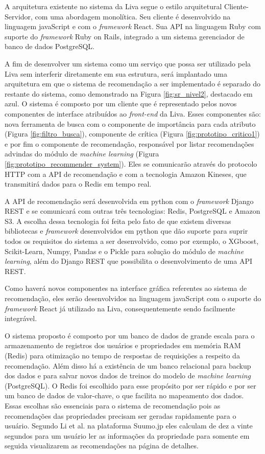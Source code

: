 A arquitetura existente no sistema da Liva segue o estilo arquitetural Cliente-Servidor, com uma abordagem monolítica. Seu cliente é desenvolvido na linguagem javaScript e com o \textit{framework} React. Sua API na linguagem Ruby com suporte do \textit{framework} Ruby on Rails, integrado a um sistema gerenciador de banco de dados PostgreSQL.

A fim de desenvolver um sistema como um serviço que possa ser utilizado pela Liva sem interferir diretamente em sua estrutura, será implantado uma arquitetura em que o sistema de recomendação a ser implementado é separado do restante do sistema, como demonstrado na Figura \ref{fig:sr_nivel2}, destacado em azul. O sistema é composto por um cliente que é representado pelos novos componentes de interface atribuídos ao \textit{front-end} da Liva. Esses componentes são: nova ferramenta de busca com o componente de importância para cada atributo (Figura \ref{fig:filtro_busca}), componente de crítica (Figura \ref{fig:prototipo_critico1}) e por fim o componente de recomendação, responsável por listar recomendações advindas do módulo de \textit{machine learning} (Figura \ref{fig:prototipo_recommender_system}). Eles se comunicarão através do protocolo HTTP com a API de recomendação e com a tecnologia Amazon Kineses, que transmitirá dados para o Redis em tempo real.

A API de recomendação será desenvolvida em python com o \textit{framework} Django REST e se comunicará com outras três tecnologias: Redis, PostgreSQL e Amazon S3. A escolha dessa tecnologia foi feita pelo fato de que existem diversas bibliotecas e \textit{framework} desenvolvidos em python que dão suporte para suprir todos os requisitos do sistema a ser desenvolvido, como por exemplo, o XGboost, Scikit-Learn, Numpy, Pandas e o Pickle para solução do módulo de \textit{machine learning}, além do Django REST que possibilita o desenvolvimento de uma API REST.

Como haverá novos componentes na interface gráfica referentes ao sistema de recomendação, eles serão desenvolvidos na linguagem javaScript com o suporte do \textit{framework} React já utilizado na Liva, consequentemente sendo facilmente integrável.

O sistema proposto é composto por um banco de dados de grande escala para o armazenamento de registros dos usuários e propriedades em memória RAM (Redis) para otimização no tempo de respostas de requisições a respeito da recomendação. Além disso há a existência de um banco relacional para backup dos dados e para salvar novos dados de treinos do modelo de \textit{machine learning} (PostgreSQL). O Redis foi escolhido para esse propósito por ser rápido e por ser um banco de dados de valor-chave, o que facilita no mapeamento dos dados. Essas escolhas são essenciais para o sistema de recomendação pois as recomendações das propriedades precisam ser geradas rapidamente para o usuário. Segundo Li et al. \cite{Summo:2017} na plataforma Suumo.jp eles calculam de dez a vinte segundos para um usuário ler as informações da propriedade para somente em seguida visualizarem as recomendações na página de detalhes. 

